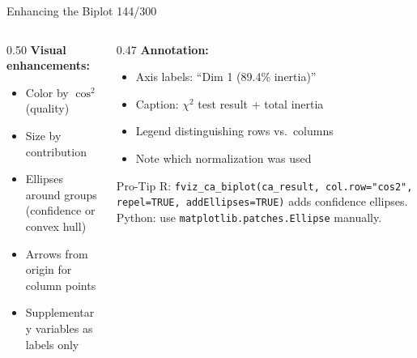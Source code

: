 \documentclass[10pt]{beamer}
\newcommand{\smark}[1]{\hfill{\scriptsize\color{codegray}#1}}
\begin{document}
\begin{frame}{Enhancing the Biplot}
\smark{144/300}
\begin{columns}[T]
\begin{column}{0.50\textwidth}
    \textbf{Visual enhancements:}
    \begin{itemize}
        \item Color by $\cos^2$ (quality)
        \item Size by contribution
        \item Ellipses around groups (confidence or convex hull)
        \item Arrows from origin for column points
        \item Supplementary variables as labels only
    \end{itemize}
\end{column}
\begin{column}{0.47\textwidth}
    \textbf{Annotation:}
    \begin{itemize}
        \item Axis labels: ``Dim 1 (89.4\% inertia)''
        \item Caption: $\chi^2$ test result + total inertia
        \item Legend distinguishing rows vs.\ columns
        \item Note which normalization was used
    \end{itemize}
    \vspace{0.1cm}
    \begin{alertblock}{Pro-Tip}
        \scriptsize R: \texttt{fviz\_ca\_biplot(ca\_result, col.row="cos2", repel=TRUE, addEllipses=TRUE)} adds confidence ellipses. Python: use \texttt{matplotlib.patches.Ellipse} manually.
    \end{alertblock}
\end{column}
\end{columns}
\end{frame}
\end{document}
